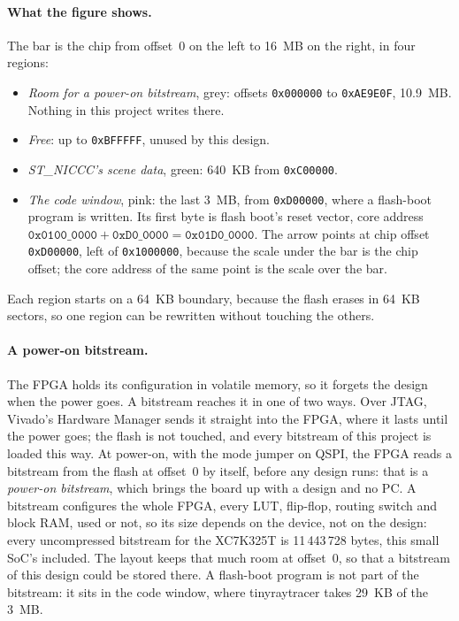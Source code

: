 \documentclass[11pt,a4paper]{report}
\begin{document}
\paragraph{What the figure shows.} The bar is the chip from offset~0 on the left to 16~MB on
the right, in four regions:
\begin{itemize}[leftmargin=*, itemsep=1pt]
  \item \emph{Room for a power-on bitstream}, grey: offsets \texttt{0x000000} to
    \texttt{0xAE9E0F}, 10.9~MB. Nothing in this project writes there.
  \item \emph{Free}: up to \texttt{0xBFFFFF}, unused by this design.
  \item \emph{ST\_NICCC's scene data}, green: 640~KB from \texttt{0xC00000}.
  \item \emph{The code window}, pink: the last 3~MB, from \texttt{0xD00000}, where a
    flash-boot program is written. Its first byte is flash boot's reset vector, core address
    $\texttt{0x0100\_0000} + \texttt{0xD0\_0000} = \texttt{0x01D0\_0000}$. The arrow points at
    chip offset \texttt{0xD00000}, left of \texttt{0x1000000}, because the scale under the bar
    is the chip offset; the core address of the same point is the scale over the bar.
\end{itemize}
Each region starts on a 64~KB boundary, because the flash erases in 64~KB sectors, so one
region can be rewritten without touching the others.

\paragraph{A power-on bitstream.} The FPGA holds its configuration in volatile memory, so it
forgets the design when the power goes. A bitstream reaches it in one of two ways. Over JTAG,
Vivado's Hardware Manager sends it straight into the FPGA, where it lasts until the power
goes; the flash is not touched, and every bitstream of this project is loaded this way. At
power-on, with the mode jumper on QSPI, the FPGA reads a bitstream from the flash at
offset~0 by itself, before any design runs: that is a \emph{power-on bitstream}, which brings
the board up with a design and no PC. A bitstream configures the whole FPGA, every LUT,
flip-flop, routing switch and block RAM, used or not, so its size depends on the device, not
on the design: every uncompressed bitstream for the XC7K325T is 11\,443\,728 bytes, this small
SoC's included. The layout keeps that much room at offset~0, so that a bitstream of this
design could be stored there. A flash-boot program is not part of the bitstream: it sits in
the code window, where tinyraytracer takes 29~KB of the 3~MB.
\end{document}

